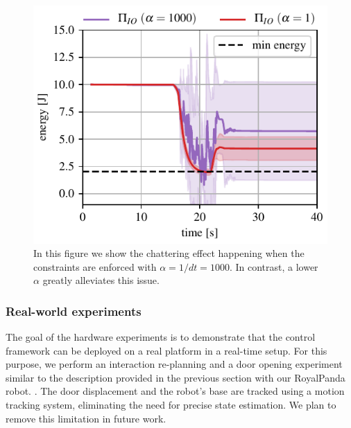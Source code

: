 \begin{figure}[t]
\centering
\includegraphics[width=0.8\columnwidth]{figures/fix_experiment/passivity_coefficient_comparison.pdf}
\caption{In this figure we show the chattering effect happening when the constraints are enforced with $\alpha = 1/dt = 1000$. In contrast, a lower $\alpha$ greatly alleviates this issue.}\label{fig:tank_as_zbf}
\end{figure}

\vspace{0.3cm}
\subsubsection{Real-world experiments}
The goal of the hardware experiments is to demonstrate that the control framework can be deployed on a real platform in a real-time setup. For this purpose, we perform an interaction re-planning and a door opening experiment similar to the description provided in the previous section with our RoyalPanda robot. . The door displacement and the robot's base are tracked using a motion tracking system, eliminating the need for precise state estimation. We plan to remove this limitation in future work. 

